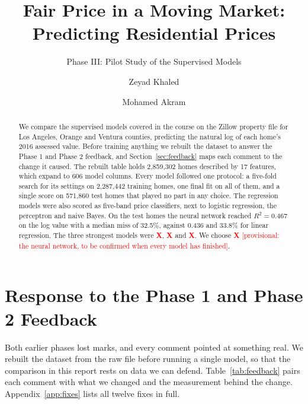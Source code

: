 \documentclass[sigconf,nonacm,10pt]{acmart}
\newcommand{\X}{\textcolor{red}{\textbf{X}}}
\newcommand{\pending}[1]{\textcolor{red}{[#1]}}
\begin{document}
\title{Fair Price in a Moving Market: Predicting Residential Prices}
\subtitle{Phase III: Pilot Study of the Supervised Models}

\author{Zeyad Khaled}

\author{Mohamed Akram}

\begin{abstract}
We compare the supervised models covered in the course on the Zillow property file for Los Angeles, Orange and Ventura counties, predicting the natural log of each home's 2016 assessed value. Before training anything we rebuilt the dataset to answer the Phase 1 and Phase 2 feedback, and Section~\ref{sec:feedback} maps each comment to the change it caused. The rebuilt table holds 2,859,302 homes described by 17 features, which expand to 606 model columns. Every model followed one protocol: a five-fold search for its settings on 2,287,442 training homes, one final fit on all of them, and a single score on 571,860 test homes that played no part in any choice. The regression models were also scored as five-band price classifiers, next to logistic regression, the perceptron and naive Bayes. On the test homes the neural network reached $R^2 = 0.467$ on the log value with a median miss of 32.5\%, against 0.436 and 33.8\% for linear regression. The three strongest models were \X, \X{} and \X. We choose \X{} \pending{provisional: the neural network, to be confirmed when every model has finished}.
\end{abstract}


\maketitle

\section{Response to the Phase 1 and Phase 2 Feedback}
\label{sec:feedback}

Both earlier phases lost marks, and every comment pointed at something real. We rebuilt the dataset from the raw file before running a single model, so that the comparison in this report rests on data we can defend. Table~\ref{tab:feedback} pairs each comment with what we changed and the measurement behind the change. Appendix~\ref{app:fixes} lists all twelve fixes in full.
\end{document}
